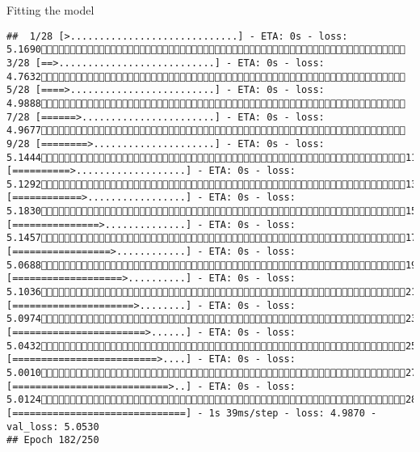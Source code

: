 \documentclass[
  ignorenonframetext,
]{beamer}
\begin{document}
\begin{frame}[fragile]{Fitting the model}
\begin{verbatim}
##  1/28 [>.............................] - ETA: 0s - loss: 5.1690 3/28 [==>...........................] - ETA: 0s - loss: 4.7632 5/28 [====>.........................] - ETA: 0s - loss: 4.9888 7/28 [======>.......................] - ETA: 0s - loss: 4.9677 9/28 [========>.....................] - ETA: 0s - loss: 5.144411/28 [==========>...................] - ETA: 0s - loss: 5.129213/28 [============>.................] - ETA: 0s - loss: 5.183015/28 [===============>..............] - ETA: 0s - loss: 5.145717/28 [=================>............] - ETA: 0s - loss: 5.068819/28 [===================>..........] - ETA: 0s - loss: 5.103621/28 [=====================>........] - ETA: 0s - loss: 5.097423/28 [=======================>......] - ETA: 0s - loss: 5.043225/28 [=========================>....] - ETA: 0s - loss: 5.001027/28 [===========================>..] - ETA: 0s - loss: 5.012428/28 [==============================] - 1s 39ms/step - loss: 4.9870 - val_loss: 5.0530
## Epoch 182/250

\end{verbatim}
\end{frame}
\end{document}
